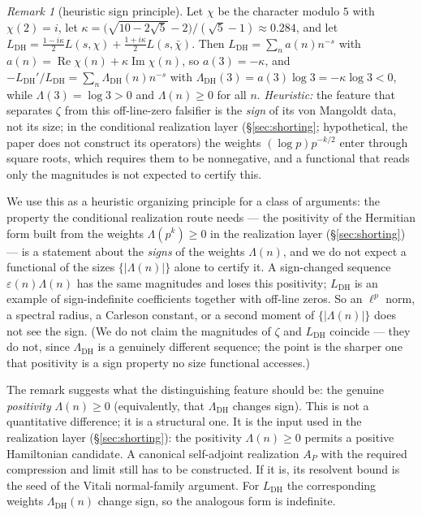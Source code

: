 \documentclass[11pt]{amsart}
\theoremstyle{definition}
\theoremstyle{remark}
\newtheorem{remark}[theorem]{Remark}
\theoremstyle{definition}
\renewcommand{\Re}{\operatorname{Re}}
\renewcommand{\Im}{\operatorname{Im}}
\begin{document}
\begin{remark}[heuristic sign principle]\label{thm:marginality}
Let $\chi$ be the character modulo $5$ with $\chi(2)=i$, let
$\kappa=\bigl(\sqrt{10-2\sqrt5}-2\bigr)/(\sqrt5-1)\approx0.284$, and let
$L_{\mathrm{DH}}=\frac{1-i\kappa}2L(s,\chi)+\frac{1+i\kappa}2L(s,\bar\chi)$. Then
$L_{\mathrm{DH}}=\sum_na(n)n^{-s}$ with $a(n)=\Re\chi(n)+\kappa\Im\chi(n)$, so $a(3)=-\kappa$, and
$-L_{\mathrm{DH}}'/L_{\mathrm{DH}}=\sum_n\Lambda_{\mathrm{DH}}(n)n^{-s}$ with
$\Lambda_{\mathrm{DH}}(3)=a(3)\log3=-\kappa\log3<0$, while $\Lambda(3)=\log3>0$ and $\Lambda(n)\ge0$ for
all $n$. \emph{Heuristic:} the feature that separates $\zeta$ from this off-line-zero falsifier is the
\emph{sign} of its von Mangoldt data, not its size; in the conditional realization layer (\S\ref{sec:shorting}; hypothetical, the paper does not construct its operators) the weights $(\log p)p^{-k/2}$ enter through square roots, which requires them to be nonnegative, and a functional that reads only the magnitudes is not expected to certify this.
\end{remark}

We use this as a heuristic organizing principle for a class of arguments: the property the conditional realization route needs --- the positivity of the Hermitian form built from the weights $\Lambda(p^k)\ge0$ in the realization layer (\S\ref{sec:shorting}) --- is a statement about the \emph{signs} of the weights $\Lambda(n)$, and we do
not expect a functional of the sizes $\{|\Lambda(n)|\}$ alone to certify it. A sign-changed sequence
$\varepsilon(n)\Lambda(n)$ has the same magnitudes and loses this positivity; $L_{\mathrm{DH}}$ is an
example of sign-indefinite coefficients together with off-line zeros. So an $\ell^p$ norm, a spectral radius, a Carleson
constant, or a second moment of $\{|\Lambda(n)|\}$ does not see the sign.
(We do not claim the magnitudes of $\zeta$ and $L_{\mathrm{DH}}$ coincide --- they do not, since
$\Lambda_{\mathrm{DH}}$ is a genuinely different sequence; the point is the sharper one that positivity is
a sign property no size functional accesses.)

The remark suggests what the distinguishing feature should be: the genuine
\emph{positivity} $\Lambda(n)\ge0$ (equivalently, that $\Lambda_{\mathrm{DH}}$ changes sign). This is not a
quantitative difference; it is a structural one. It is the input used in the realization layer (\S\ref{sec:shorting}): the positivity $\Lambda(n)\ge0$ permits a positive
Hamiltonian candidate.  A canonical self-adjoint realization $A_P$ with the required compression and
limit still has to be constructed.  If it is, its resolvent bound is the seed of the Vitali
normal-family argument. For $L_{\mathrm{DH}}$ the corresponding weights $\Lambda_{\mathrm{DH}}(n)$ change sign, so the analogous form is indefinite.
\end{document}
